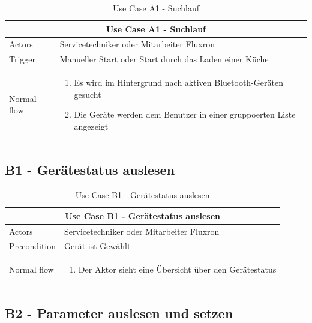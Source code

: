 \begin{table}[H]
\begin{tabular}{|p{3cm}|p{10cm}|}
  \hline
  \multicolumn{2}{|c|}{Use Case A1 - Suchlauf}
  \\\hline
  	Actors
  &
	Servicetechniker oder Mitarbeiter Fluxron
  \\\hline
  	Trigger
  &
    Manueller Start oder Start durch das Laden einer Küche
  \\\hline
  	Normal flow
  &
	\begin{enumerate}
	  \item Es wird im Hintergrund nach aktiven Bluetooth-Geräten gesucht
 	  \item Die Geräte werden dem Benutzer in einer gruppoerten Liste angezeigt
	\end{enumerate}
  \\\hline
\end{tabular}
\caption{Use Case A1 - Suchlauf}
\end{table}

\subsection{B1 - Gerätestatus auslesen}
\label{subsec:B1 - Gerätestatus auslesen}

\begin{table}[H]
\begin{tabular}{|p{3cm}|p{10cm}|}
  \hline
  \multicolumn{2}{|c|}{Use Case B1 - Gerätestatus auslesen}
  \\\hline
  	Actors
  &
	Servicetechniker oder Mitarbeiter Fluxron
  \\\hline
  	Precondition
  &
    Gerät ist Gewählt
  \\\hline
  	Normal flow
  &
	\begin{enumerate}
	  \item Der Aktor sieht eine Übersicht über den Gerätestatus
	\end{enumerate}
  \\\hline
\end{tabular}
\caption{Use Case B1 - Gerätestatus auslesen}
\end{table}

\subsection{B2 - Parameter auslesen und setzen}
\label{subsec:B2 - Parameter auslesen und setzen}

